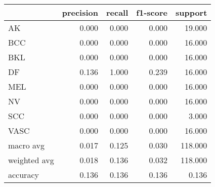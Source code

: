 \begin{tabular}{lrrrr}
\toprule
 & precision & recall & f1-score & support \\
\midrule
AK & 0.000 & 0.000 & 0.000 & 19.000 \\
BCC & 0.000 & 0.000 & 0.000 & 16.000 \\
BKL & 0.000 & 0.000 & 0.000 & 16.000 \\
DF & 0.136 & 1.000 & 0.239 & 16.000 \\
MEL & 0.000 & 0.000 & 0.000 & 16.000 \\
NV & 0.000 & 0.000 & 0.000 & 16.000 \\
SCC & 0.000 & 0.000 & 0.000 & 3.000 \\
VASC & 0.000 & 0.000 & 0.000 & 16.000 \\
macro avg & 0.017 & 0.125 & 0.030 & 118.000 \\
weighted avg & 0.018 & 0.136 & 0.032 & 118.000 \\
accuracy & 0.136 & 0.136 & 0.136 & 0.136 \\
\bottomrule
\end{tabular}
